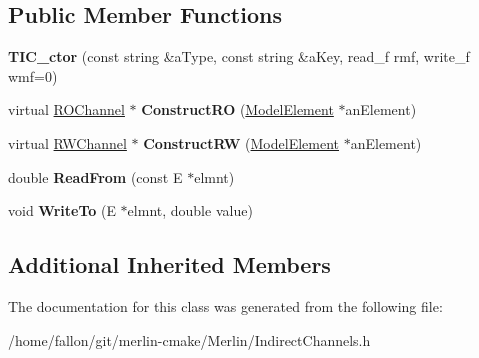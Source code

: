 \subsection*{Public Member Functions}
\begin{DoxyCompactItemize}
\item 
\mbox{\label{classTIC__ctor_accbde71b45fbbb2e93642b0857088b69}} 
{\bfseries T\+I\+C\+\_\+ctor} (const string \&a\+Type, const string \&a\+Key, read\+\_\+f rmf, write\+\_\+f wmf=0)
\item 
\mbox{\label{classTIC__ctor_a594ebb7aba385d7f6a9e9596bd1774d6}} 
virtual \hyperlink{classROChannel}{R\+O\+Channel} $\ast$ {\bfseries Construct\+RO} (\hyperlink{classModelElement}{Model\+Element} $\ast$an\+Element)
\item 
\mbox{\label{classTIC__ctor_a301b98ae1e78d6a197b2a2e00863107f}} 
virtual \hyperlink{classRWChannel}{R\+W\+Channel} $\ast$ {\bfseries Construct\+RW} (\hyperlink{classModelElement}{Model\+Element} $\ast$an\+Element)
\item 
\mbox{\label{classTIC__ctor_af94bae135ac1e37618ab604016711916}} 
double {\bfseries Read\+From} (const E $\ast$elmnt)
\item 
\mbox{\label{classTIC__ctor_aa8466b428c58f67609a012ba2707a7db}} 
void {\bfseries Write\+To} (E $\ast$elmnt, double value)
\end{DoxyCompactItemize}
\subsection*{Additional Inherited Members}


The documentation for this class was generated from the following file\+:\begin{DoxyCompactItemize}
\item 
/home/fallon/git/merlin-\/cmake/\+Merlin/Indirect\+Channels.\+h\end{DoxyCompactItemize}
